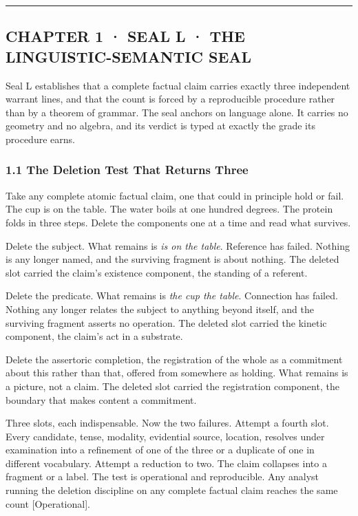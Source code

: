 \documentclass[10pt,twocolumn]{article}
\begin{document}
\begin{center}\rule{0.5\linewidth}{0.5pt}\end{center}

\hypertarget{chapter-1-seal-l-the-linguistic-semantic-seal}{%
\subsection{CHAPTER 1 · SEAL L · THE LINGUISTIC-SEMANTIC
SEAL}\label{chapter-1-seal-l-the-linguistic-semantic-seal}}

Seal L establishes that a complete factual claim carries exactly three
independent warrant lines, and that the count is forced by a
reproducible procedure rather than by a theorem of grammar. The seal
anchors on language alone. It carries no geometry and no algebra, and
its verdict is typed at exactly the grade its procedure earns.

\hypertarget{the-deletion-test-that-returns-three}{%
\subsubsection{1.1 The Deletion Test That Returns
Three}\label{the-deletion-test-that-returns-three}}

Take any complete atomic factual claim, one that could in principle hold
or fail. The cup is on the table. The water boils at one hundred
degrees. The protein folds in three steps. Delete the components one at
a time and read what survives.

Delete the subject. What remains is \emph{is on the table}. Reference
has failed. Nothing is any longer named, and the surviving fragment is
about nothing. The deleted slot carried the claim's existence component,
the standing of a referent.

Delete the predicate. What remains is \emph{the cup the table}.
Connection has failed. Nothing any longer relates the subject to
anything beyond itself, and the surviving fragment asserts no operation.
The deleted slot carried the kinetic component, the claim's act in a
substrate.

Delete the assertoric completion, the registration of the whole as a
commitment about this rather than that, offered from somewhere as
holding. What remains is a picture, not a claim. The deleted slot
carried the registration component, the boundary that makes content a
commitment.

Three slots, each indispensable. Now the two failures. Attempt a fourth
slot. Every candidate, tense, modality, evidential source, location,
resolves under examination into a refinement of one of the three or a
duplicate of one in different vocabulary. Attempt a reduction to two.
The claim collapses into a fragment or a label. The test is operational
and reproducible. Any analyst running the deletion discipline on any
complete factual claim reaches the same count {[}Operational{]}.
\end{document}
